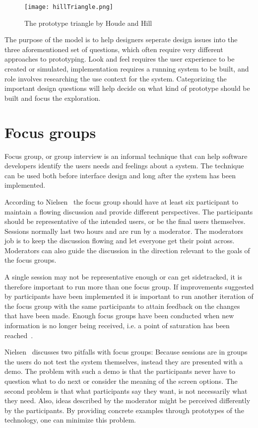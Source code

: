 \begin{figure}[h!]
	\centering
		\texttt{[image: hillTriangle.png]}
		\caption{\footnotesize The prototype triangle by Houde and Hill~\cite{prototypesPrototype}}
		\label{fig:hillTriangle}
\end{figure}

The purpose of the model is to help designers seperate design issues into the three aforementioned set of questions, which often require very different approaches to prototyping. Look and feel requires the user experience to be created or simulated, implementation requires a running system to be built, and role involves researching the use context for the system. Categorizing the important design questions will help decide on what kind of prototype should be built and focus the exploration.

\section{Focus groups}
\label{sec:focusGroup}
Focus group, or group interview is an informal technique that can help software developers identify the users needs and feelings about a system. The technique can be used both before interface design and long after the system has been implemented. 

According to Nielsen~\cite{focusGroup} the focus group should have at least six participant to maintain a flowing discussion and provide different perspectives. The participants should be representative of the intended users, or be the final users themselves. Sessions normally last two hours and are run by a moderator. The moderators job is to keep the discussion flowing and let everyone get their point across. Moderators can also guide the discussion in the direction relevant to the goals of the focus groups. 

A single session may not be representative enough or can get sidetracked, it is therefore important to run more than one focus group. If improvements suggested by participants have been implemented it is important to run another iteration of the focus group with the same participants to attain feedback on the changes that have been made. Enough focus groups have been conducted when new information is no longer being received, i.e. a point of saturation has been reached~\cite{howFocusGroup}. 

Nielsen~\cite{focusGroup} discusses two pitfalls with focus groups: Because sessions are in groups the users do not test the system themselves, instead they are presented with a demo. The problem with such a demo is that the participants never have to question what to do next or consider the meaning of the screen options. The second problem is that what participants say they want, is not necessarily what they need. Also, ideas described by the moderator might be perceived differently by the participants. By providing concrete examples through prototypes of the technology, one can minimize this problem.

